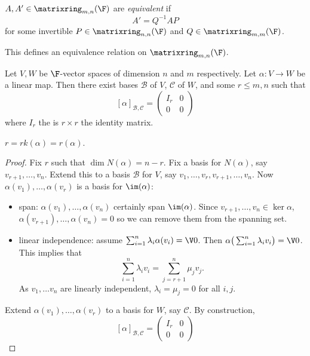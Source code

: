 \documentclass[a4paper]{article}
\newcommand*{\M}{\matrixring}
\newcommand*{\basis}{\mathcal}
\theoremstyle{definition}
\begin{document}
\begin{definition}
  \(A, A' \in \M_{m,n}(\F)\) are \emph{equivalent} if
  \[
    A' = Q^{-1}AP
  \]
  for some invertible \(P\in \M_{n,n}(\F)\) and \(Q\in \M_{m,m}(\F)\).
\end{definition}

\begin{note}
  This defines an equivalence relation on \(\M_{m,n}(\F)\).
\end{note}

\begin{proposition}
  Let \(V, W\) be \(\F\)-vector spaces of dimension \(n\) and \(m\) respectively. Let \(\alpha:V\to W\) be a linear map. Then there exist bases \(\basis B\) of \(V\), \(\basis C\) of \(W\), and some \(r\leq m,n\) such that
  \[
    [\alpha]_{\basis B,\basis C} =
    \begin{pmatrix}
      I_r & 0 \\
      0 & 0 
    \end{pmatrix}
  \]
  where \(I_r\) the is \(r\times r\) the identity matrix.
\end{proposition}

\begin{note}
  \(r = rk(\alpha) = r(\alpha)\).
\end{note}

\begin{proof}
  Fix \(r\) such that \(\dim N(\alpha) = n-r\). Fix a basis for \(N(\alpha)\), say \(v_{r+1},\dots,v_n\). Extend this to a basis \(\basis B\) for \(V\), say \(v_1,\dots,v_r,v_{r+1},\dots,v_n\). Now \(\alpha(v_1),\dots,\alpha(v_r)\) is a basis for \(\im(\alpha)\):
  \begin{itemize}
  \item span: \(\alpha(v_1),\dots, \alpha(v_n)\) certainly span \(\im(\alpha)\). Since \(v_{r+1}, \dots ,v_n \in \ker \alpha\), \(\alpha(v_{r+1}),\dots,\alpha(v_n) = 0\) so we can remove them from the spanning set.
  \item linear independence: assume \(\sum_{i=1}^{n}\lambda_i \alpha(v_i) =\V 0 \). Then \(\alpha \big(\sum_{i=1}^n\lambda_iv_i\big) =\V0\). This implies that
    \[
      \sum_{i=1}^{n}\lambda_iv_i = \sum_{j=r+1}^{n}\mu_jv_j.
    \]
    As \(v_1,\dots v_n\) are linearly independent, \(\lambda_i=\mu_j=0\) for all \(i,j\).
  \end{itemize}
  Extend \(\alpha(v_1),\dots,\alpha(v_r)\) to a basis for \(W\), say \(\basis C\). By construction,
  \[
    [\alpha]_{\basis B,\basis C} =
    \begin{pmatrix}
      I_r & 0 \\
      0 & 0
    \end{pmatrix}
  \]
\end{proof}
\end{document}
